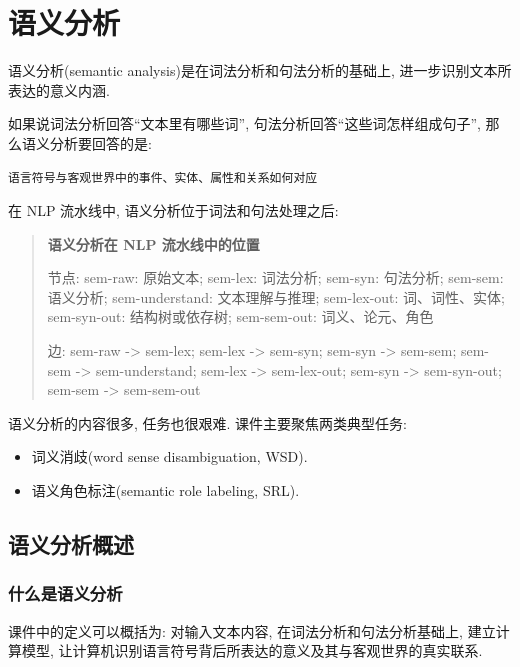 
\chapter{语义分析}


语义分析(semantic analysis)是在词法分析和句法分析的基础上, 进一步识别文本所表达的意义内涵.

如果说词法分析回答“文本里有哪些词”, 句法分析回答“这些词怎样组成句子”,
那么语义分析要回答的是:

\begin{Verbatim}[breaklines=true,breakanywhere=true,fontsize=\small]
语言符号与客观世界中的事件、实体、属性和关系如何对应
\end{Verbatim}

在 NLP 流水线中, 语义分析位于词法和句法处理之后:

\begin{quote}
\small
\textbf{语义分析在 NLP 流水线中的位置}
\par 节点: sem-raw: 原始文本; sem-lex: 词法分析; sem-syn: 句法分析; sem-sem: 语义分析; sem-understand: 文本理解与推理; sem-lex-out: 词、词性、实体; sem-syn-out: 结构树或依存树; sem-sem-out: 词义、论元、角色
\par 边: sem-raw -\textgreater{} sem-lex; sem-lex -\textgreater{} sem-syn; sem-syn -\textgreater{} sem-sem; sem-sem -\textgreater{} sem-understand; sem-lex -\textgreater{} sem-lex-out; sem-syn -\textgreater{} sem-syn-out; sem-sem -\textgreater{} sem-sem-out
\end{quote}

语义分析的内容很多, 任务也很艰难.
课件主要聚焦两类典型任务:

\begin{itemize}
\item 词义消歧(word sense disambiguation, WSD).
\item 语义角色标注(semantic role labeling, SRL).
\end{itemize}

\section{语义分析概述}


\subsection{什么是语义分析}


课件中的定义可以概括为:
对输入文本内容, 在词法分析和句法分析基础上, 建立计算模型,
让计算机识别语言符号背后所表达的意义及其与客观世界的真实联系.

